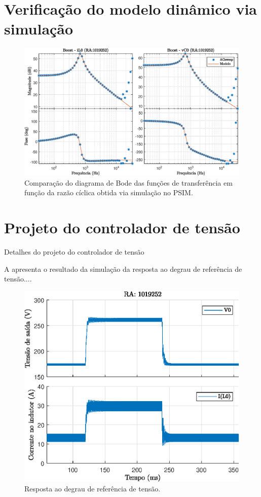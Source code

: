 \section{Verificação do modelo dinâmico via simulação}


\begin{figure}[!ht]
	\centering
	\includegraphics[width=1\linewidth]{Figs/BoostACSweep}
	\caption{Comparação do diagrama de Bode das funções de transferência em função da razão cíclica obtida via simulação no PSIM.}
	\label{fig:ValidacaoModelo}
\end{figure}


\section{Projeto do controlador de tensão}
Detalhes do projeto do controlador de tensão







A  apresenta o resultado da simulação da resposta ao degrau de referência de tensão....

\begin{figure}[!ht]
	\centering
	\includegraphics[width=0.9\linewidth]{Figs/Boost1malha}
	\caption{Resposta ao degrau de referência de tensão.}
	\label{fig:Boost1malha}
\end{figure}




